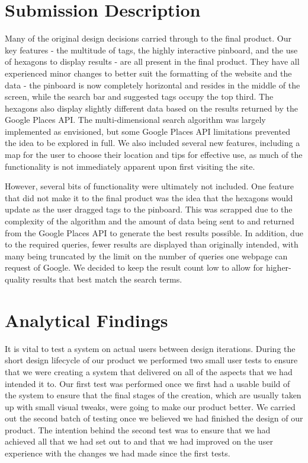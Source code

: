 \documentclass[10pt,a4paper]{article}
\begin{document}
\section*{Submission Description}

Many of the original design decisions carried through to the final product. Our key features - the multitude of tags, the highly interactive pinboard, and the use of hexagons to display results - are all present in the final product. They have all experienced minor changes to better suit the formatting of the website and the data - the pinboard is now completely horizontal and resides in the middle of the screen, while the search bar and suggested tags occupy the top third. The hexagons also display slightly different data based on the results returned by the Google Places API. The multi-dimensional search algorithm was largely implemented as envisioned, but some Google Places API limitations prevented the idea to be explored in full. We also included several new features, including a map for the user to choose their location and tips for effective use, as much of the functionality is not immediately apparent upon first visiting the site.

However, several bits of functionality were ultimately not included. One feature that did not make it to the final product was the idea that the hexagons would update as the user dragged tags to the pinboard. This was scrapped due to the complexity of the algorithm and the amount of data being sent to and returned from the Google Places API to generate the best results possible. In addition, due to the required queries, fewer results are displayed than originally intended, with many being truncated by the limit on the number of queries one webpage can request of Google. We decided to keep the result count low to allow for higher-quality results that best match the search terms.

\section*{Analytical Findings}

It is vital to test a system on actual users between design iterations. During the short design lifecycle of our product we performed two small user tests to ensure that we were creating a system that delivered on all of the aspects that we had intended it to. Our first test was performed once we first had a usable build of the system to ensure that the final stages of the creation, which are usually taken up with small visual tweaks, were going to make our product better. We carried out the second batch of testing once we believed we had finished the design of our product. The intention behind the second test was to ensure that we had achieved all that we had set out to and that we had improved on the user experience with the changes we had made since the first tests.
\end{document}
